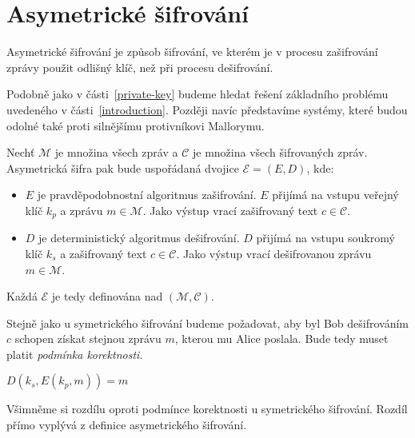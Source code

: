 \documentclass[
  program=infoi,
  biblatex,
  figures=false,
  glossaries,
  index
]{kidiplom}
\begin{document}
    \newpage
    

\part{Asymetrické šifrování}\label{public-key}

        
    Asymetrické šifrování je způsob šifrování, ve kterém je v procesu zašifrování zprávy použit odlišný klíč, než při procesu dešifrování.

    \medskip

    Podobně jako v části~\ref{private-key} budeme hledat řešení základního problému uvedeného v části~\ref{introduction}.
    Později navíc představíme systémy, které budou odolné také proti silnějšímu protivníkovi Mallorymu.

    \medskip

    \noindent
    Nechť $\mathcal{M}$ je množina všech zpráv a $\mathcal{C}$ je množina všech šifrovaných zpráv.
    Asymetrická šifra pak bude uspořádaná dvojice $\mathcal{E}  = (E, D)$, kde:

    \begin{itemize}
        \item
            $E$ je pravděpodobnostní algoritmus zašifrování.
            $E$ přijímá na vstupu veřejný klíč $k_p$ a zprávu $m \in \mathcal{M}$.
            Jako výstup vrací zašifrovaný text $c \in \mathcal{C}$.
        \item
            $D$ je deterministický algoritmus dešifrování. $D$ přijímá na vstupu soukromý klíč $k_s$ a zašifrovaný text $c \in \mathcal{C}$.
            Jako výstup vrací dešifrovanou zprávu $m \in \mathcal{M}$.
        
    \end{itemize}

    Každá $\mathcal{E}$ je tedy definována nad $(\mathcal{M},\mathcal{C})$.

    \medskip
    \noindent

    Stejně jako u symetrického šifrování budeme požadovat, aby byl Bob dešifrováním $c$ schopen získat stejnou zprávu $m$, kterou mu Alice poslala.
    Bude tedy muset platit \emph{podmínka korektnosti}.

    \begin{center}
        $D(k_s, E(k_p, m))=m$
    \end{center}

    \begin{remark}
        Všimněme si rozdílu oproti podmínce korektnosti u symetrického šifrování.
        Rozdíl přímo vyplývá z definice asymetrického šifrování.
    \end{remark}
\end{document}
